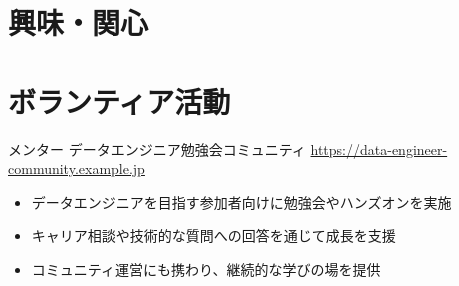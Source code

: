\documentclass[a4paper, serif, 10pt]{moderncv}
\begin{document}
\section{興味・関心}

\section{ボランティア活動}

        {メンター}
        {データエンジニア勉強会コミュニティ}
        {\url{https://data-engineer-community.example.jp}}
        {}
        {\begin{itemize}
\item データエンジニアを目指す参加者向けに勉強会やハンズオンを実施
\item キャリア相談や技術的な質問への回答を通じて成長を支援
\item コミュニティ運営にも携わり、継続的な学びの場を提供
\end{itemize}}
    
\end{document}
